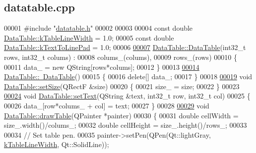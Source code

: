 \hypertarget{datatable_8cpp_source}{}\subsection{datatable.\+cpp}
\label{datatable_8cpp_source}

\begin{DoxyCode}
00001 \textcolor{preprocessor}{#include "\hyperlink{datatable_8h}{datatable.h}"}
00002 
00003 
00004 \textcolor{keyword}{const} \textcolor{keywordtype}{double} \hyperlink{class_data_table_aa4aed4c624ca9a8e68c9ecc4d2b43458}{DataTable::kTableLineWidth} = 1.0;
00005 \textcolor{keyword}{const} \textcolor{keywordtype}{double} \hyperlink{class_data_table_ab0703eeee2cf6e45fc74356432434ac6}{DataTable::kTextToLinePad} = 1.0;
00006 
\hypertarget{datatable_8cpp_source_l00007}{}\hyperlink{class_data_table_a9d37b5de498e8436f74cd51e51ec4948}{00007} \hyperlink{class_data_table_a9d37b5de498e8436f74cd51e51ec4948}{DataTable::DataTable}(int32\_t rows, int32\_t colums) :
00008   colums\_(colums),
00009   rows\_(rows)
00010 \{
00011   data\_ = \textcolor{keyword}{new} QString[rows*colums];
00012 \}
00013 
\hypertarget{datatable_8cpp_source_l00014}{}\hyperlink{class_data_table_a86095a8a5abd63d50603d4ca0db253d7}{00014} \hyperlink{class_data_table_a86095a8a5abd63d50603d4ca0db253d7}{DataTable::~DataTable}()
00015 \{
00016   \textcolor{keyword}{delete}[] data\_;
00017 \}
00018 
\hypertarget{datatable_8cpp_source_l00019}{}\hyperlink{class_data_table_a8a8cd6f95caaaff148993f8e28eeb703}{00019} \textcolor{keywordtype}{void} \hyperlink{class_data_table_a8a8cd6f95caaaff148993f8e28eeb703}{DataTable::setSize}(QRectF &size)
00020 \{
00021   size\_ = size;
00022 \}
00023 
\hypertarget{datatable_8cpp_source_l00024}{}\hyperlink{class_data_table_aee0d28c77116b51360f0124a529cb3ff}{00024} \textcolor{keywordtype}{void} \hyperlink{class_data_table_aee0d28c77116b51360f0124a529cb3ff}{DataTable::setText}(QString &text, int32\_t row, int32\_t col)
00025 \{
00026   data\_[row*colums\_ + col] = text;
00027 \}
00028 
\hypertarget{datatable_8cpp_source_l00029}{}\hyperlink{class_data_table_a3a3695e88dcd4d4aad5cc941ec7e6e55}{00029} \textcolor{keywordtype}{void} \hyperlink{class_data_table_a3a3695e88dcd4d4aad5cc941ec7e6e55}{DataTable::drawTable}(QPainter *painter)
00030 \{
00031   \textcolor{keywordtype}{double} cellWidth = size\_.width()/colums\_;
00032   \textcolor{keywordtype}{double} cellHeight = size\_.height()/rows\_;
00033 
00034   \textcolor{comment}{// Set table pen.}
00035   painter->setPen(QPen(Qt::lightGray, \hyperlink{class_data_table_aa4aed4c624ca9a8e68c9ecc4d2b43458}{kTableLineWidth}, Qt::SolidLine));

\end{DoxyCode}

